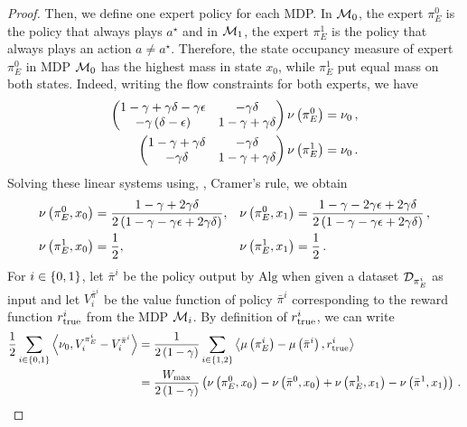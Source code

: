 \begin{proof}
    Then, we define one expert policy for each MDP. In $\mathcal{M}_0$, the expert $\pi_E^0$ is the policy that always plays $a^\star$ and in $\mathcal{M}_1$, the expert $\pi_E^1$ is the policy that always plays an action $a \neq a^\star$. Therefore, the state occupancy measure of expert $\pi_E^0$ in MDP $\mathcal{M}_0$ has the highest mass in state $x_0$, while $\pi_E^1$ put equal mass on both states. Indeed, writing the flow constraints for both experts, we have
    \begin{align*}
        \begin{pmatrix}
            1 - \gamma + \gamma \delta - \gamma \epsilon & - \gamma \delta \\
            - \gamma \left( \delta - \epsilon \right) & 1 - \gamma + \gamma \delta
        \end{pmatrix}
        \nu \left( \pi_E^0 \right) &= \nu_0\,, \\
        \begin{pmatrix}
            1 - \gamma + \gamma \delta & - \gamma \delta \\
            - \gamma \delta & 1 - \gamma + \gamma \delta
        \end{pmatrix}
        \nu \left( \pi_E^1 \right) &= \nu_0\,.
    \end{align*}
    Solving these linear systems using, \eg, Cramer's rule, we obtain
    \begin{align*}
        \nu \left( \pi_E^0, x_0 \right) &= \frac{1 - \gamma + 2 \gamma \delta}{2 \left( 1 - \gamma - \gamma \epsilon + 2 \gamma \delta \right)}, &\nu \left( \pi_E^0, x_1 \right) &= \frac{1 - \gamma - 2 \gamma \epsilon + 2 \gamma \delta}{2 \left( 1 - \gamma - \gamma \epsilon + 2 \gamma \delta \right)}\,, \\
        \nu \left( \pi_E^1, x_0 \right) &= \frac12, &\nu \left( \pi_E^1, x_1 \right) &= \frac12\,.
    \end{align*}
    For $i \in \left\{ 0, 1 \right\}$, let $\bar\pi^i$ be the policy output by $\mathrm{Alg}$ when given a dataset $\mathcal{D}_{\pi_E^i}$ as input and let $V_i^{\bar\pi^i}$ be the value function of policy $\bar\pi^i$ corresponding to the reward function $r_{\textup{true}}^i$ from the MDP $\mathcal{M}_i$. By definition of $r_{\textup{true}}^i$, we can write
    \begin{align}
        \frac12 \sum_{i \in \scbr{0, 1}} \inp{\initial, V_i^{\pi_E^i} - V_i^{\bar\pi^i}} &= \frac{1}{2 \spr{1 - \gamma}} \sum_{i \in \scbr{1, 2}} \inp{\mu \spr{\pi_E^i} - \mu \spr{\bar\pi^i}, \true^i} \nonumber \\
        &= \frac{\WMAX}{2 \spr{1 - \gamma}} \spr{\nu \spr{\pi_E^0, x_0} - \nu \spr{\bar\pi^0, x_0} + \nu \spr{\pi_E^1, x_1} - \nu \spr{\bar\pi^1, x_1}}\,. \label{eq:appE2-average-return}

\end{align}
\end{proof}
